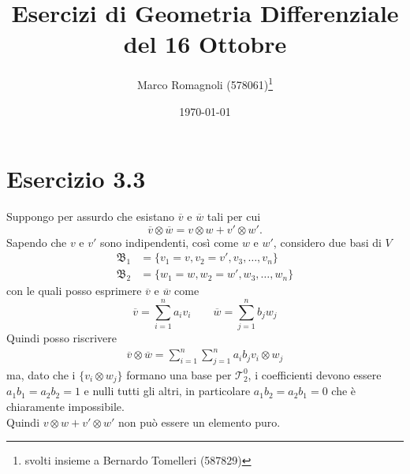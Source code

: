 \documentclass[italian,a4paper,10pt]{article}
\title{Esercizi di Geometria Differenziale\\ del 16 Ottobre}
\author{Marco Romagnoli (578061)\thanks{svolti insieme a Bernardo Tomelleri (587829)}}
\date{\today}
\begin{document}
\maketitle

\section*{Esercizio 3.3}
Suppongo per assurdo che esistano $\overline{v}$ e $\overline{w}$ tali per cui $$\overline{v} \otimes \overline{w} = v \otimes w + v' \otimes w'.$$
Sapendo che $v$ e $v'$ sono indipendenti, così come $w$ e $w'$, considero due basi di $V$ 
\begin{align*}
\mathfrak{B}_1 &= \{ v_1 = v, v_2=v', v_3,\ldots,v_n\}\\
\mathfrak{B}_2 &= \{ w_1 = w, w_2 = w', w_3,\ldots	,w_n\}
\end{align*}
con le quali posso esprimere $\overline{v}$ e $\overline{w}$ come $$\overline{v} = \sum^n_{i=1} a_i v_i \qquad  \overline{w} = \sum^n_{j=1} b_j w_j$$
Quindi posso riscrivere
\begin{align*}
\overline{v} \otimes \overline{w} = \sum^n_{i=1} \sum^n_{j=1} a_i b_j v_i \otimes w_j
\end{align*}
ma, dato che i $\{v_i \otimes w_j\}$ formano una base per $\mathcal{T}^0_2$, i coefficienti devono essere $a_1b_1=a_2b_2=1$ e nulli tutti gli altri, in particolare $a_1b_2=a_2b_1=0$ che è chiaramente impossibile.\\
Quindi $v \otimes w + v' \otimes w'$ non può essere un elemento puro.
\end{document}
